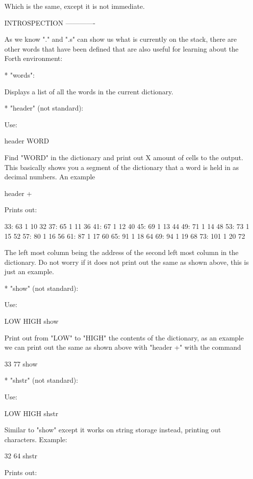 \begin{DoxyVerb}Which is the same, except it is not immediate.

INTROSPECTION
-------------

As we know "." and ".s" can show us what is currently on the stack, there are
other words that have been defined that are also useful for learning about the
Forth environment:

* "words":

Displays a list of all the words in the current dictionary.

* "header" (not standard):

Use:

    header WORD

Find "WORD" in the dictionary and print out X amount of cells to the output.
This basically shows you a segment of the dictionary that a word is held in as
decimal numbers. An example

    header +

Prints out:

    33:     63      1       10      32
    37:     65      1       11      36
    41:     67      1       12      40
    45:     69      1       13      44
    49:     71      1       14      48
    53:     73      1       15      52
    57:     80      1       16      56
    61:     87      1       17      60
    65:     91      1       18      64
    69:     94      1       19      68
    73:     101     1       20      72

The left most column being the address of the second left most column in the
dictionary. Do not worry if it does not print out the same as shown above, this
is just an example.

* "show" (not standard):

Use:

    LOW HIGH show

Print out from "LOW" to "HIGH" the contents of the dictionary, as an example we
can print out the same as shown above with "header +" with the command

    33 77 show

* "shstr" (not standard):

Use:

  LOW HIGH shstr

Similar to "show" except it works on string storage instead, printing out
characters. Example:

    32 64 shstr

Prints out:


\end{DoxyVerb}
